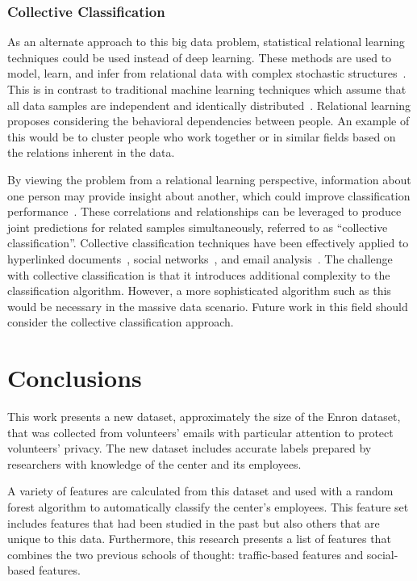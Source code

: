 \documentclass[12pt]{report}
\begin{document}
\subsection{Collective Classification}
As an alternate approach to this big data problem, statistical relational learning techniques could be used instead of deep learning.
These methods are used to model, learn, and infer from relational data with complex stochastic structures~\cite{getoor2007introduction}.
This is in contrast to traditional machine learning techniques which assume that all data samples are independent and identically distributed~\cite{taskar2002discriminative}.
Relational learning proposes considering the behavioral dependencies between people.
An example of this would be to cluster people who work together or in similar fields based on the relations inherent in the data.

By viewing the problem from a relational learning perspective, information about one person may provide insight about another, which could improve classification performance~\cite{lu2003link}.
These correlations and relationships can be leveraged to produce joint predictions for related samples simultaneously, referred to as ``collective classification''.
Collective classification techniques have been effectively applied to hyperlinked documents~\cite{taskar2002discriminative}, social networks~\cite{xiang2010modeling}, and email analysis~\cite{carvalho2005collective}.
The challenge with collective classification is that it introduces additional complexity to the classification algorithm.
However, a more sophisticated algorithm such as this would be necessary in the massive data scenario.
Future work in this field should consider the collective classification approach.



\chapter{Conclusions} \label{Conclusions}
This work presents a new dataset, approximately the size of the Enron dataset, that was collected from volunteers' emails with particular attention to protect volunteers' privacy.
The new dataset includes accurate labels prepared by researchers with knowledge of the center and its employees.

A variety of features are calculated from this dataset and used with a random forest algorithm to automatically classify the center's employees.
This feature set includes features that had been studied in the past but also others that are unique to this data.
Furthermore, this research presents a list of features that combines the two previous schools of thought: traffic-based features and social-based features.
\end{document}
